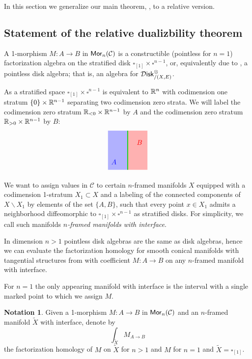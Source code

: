 \documentclass[10pt, reqno, twoside
, final
]{amsart}
\numberwithin{equation}{subsection}%
\theoremstyle{definition}
\theoremstyle{definition}
\theoremstyle{definition}
\newtheorem{nota}[defn]{Notation}
\theoremstyle{definition}
\theoremstyle{definition}
\theoremstyle{definition}
\theoremstyle{definition}
\theoremstyle{definition}
\theoremstyle{definition}
\theoremstyle{plain}
\theoremstyle{definition}
\theoremstyle{plain}
\theoremstyle{definition}
\theoremstyle{plain}
\theoremstyle{definition}
\theoremstyle{definition}
\theoremstyle{plain}
\theoremstyle{plain}
\theoremstyle{definition}
\theoremstyle{plain}
\theoremstyle{plain}
\theoremstyle{plain}
\begin{document}
In this section we generalize our main theorem, , to a relative version.

\subsection{Statement of the relative dualizbility theorem}
A 1-morphism $M:A\to B$ in $\mathsf{Mor}_n(\mathcal{C})$ is a constructible (pointless for $n=1$) factorization algebra on the stratified disk $\square_{[1]} \times \square^{n-1}$, or, equivalently due to , a pointless disk algebra; that is, an algebra for $\mathcal{D}\mathsf{isk}^{\otimes}_{/(X,E)}$.


As a stratified space $\square_{[1]} \times \square^{n-1}$ is equivalent to $\mathbb{R}^n$ with codimension one stratum $\{0\} \times \mathbb{R}^{n-1}$ separating two codimension zero strata. We will label the codimension zero stratum $\mathbb{R}_{<0} \times \mathbb{R}^{n-1}$ by $A$ and the codimension zero stratum $\mathbb{R}_{>0} \times \mathbb{R}^{n-1}$ by $B$:
$$
\begin{tikzpicture}[scale=1, baseline=(current bounding box.base)]
\fill[color=blue,opacity=0.3] (-1,0) -- (0,0) -- (0,2) -- (-1,2) -- cycle;
\fill[color=red,opacity=0.3] (0,0) -- (1,0) -- (1,2) -- (0,2) -- cycle;
\draw[very thick, green!85!black] (0,0) -- (0,2);
\draw (-0.7, 0.4) node[color=blue] {$A$} ;
\draw (0.6, 1.4) node[color=red] {$B$} ;
\end{tikzpicture}
$$


We  want to assign values in $\mathcal{C}$ to certain $n$-framed manifolds $X$ equipped with a codimension 1-stratum $X_1 \subset X$ and a labeling of the connected components of $X \backslash X_1$ by elements of the set $\{A,B\}$, such that every point $x\in X_1$ admits a neighborhood diffeomorphic to $\square_{[1]} \times \square^{n-1}$ as stratified disks. For simplicity, we call such manifolds \textit{$n$-framed manifolds with interface}.

In dimension $n>1$ pointless disk algebras are the same as disk algebras, hence we can evaluate the factorization homology for smooth conical manifolds with tangential structures from \cite{AFT-fh-stratified} with coefficient $M:A\to B$ on any $n$-framed manifold with interface.

For $n=1$ the only appearing manifold with interface is the interval with a single marked point to which we assign $M$.

\begin{nota}
Given a 1-morphism $M:A\to B$ in $\mathsf{Mor}_n(\mathcal{C})$ and an $n$-framed manifold $\widetilde{X}$ with interface, denote by
\begin{equation*}
    \int_{\widetilde{X}} M_{A\to B}
\end{equation*}
the factorization homology of $M$ on $\widetilde{X}$ for $n>1$ and $M$ for $n=1$ and $\widetilde{X}=\square_{[1]}$.
\end{nota}
\end{document}
